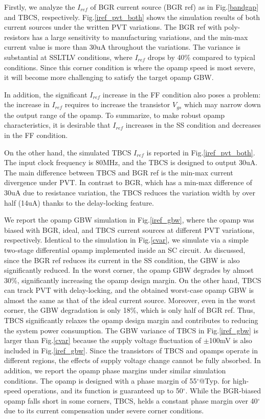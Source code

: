 \documentclass[paper]{ieice}
\begin{document}
Firstly, we analyze the $I_{ref}$ of BGR current source (BGR ref)\cite{banba1999cmos} as in Fig.\ref{bandgap} and TBCS, respectively. Fig.\ref{iref_pvt_both} shows the simulation results of both current sources under the written PVT variations. The BGR ref with poly-resistors has a large sensitivity to manufacturing variations, and the min-max current value is more than 30uA throughout the variations. The variance is substantial at SSLTLV conditions, where $I_{ref}$ drops by 40\% compared to typical conditions.
Since this corner condition is where the opamp speed is most severe, it will become more challenging to satisfy the target opamp GBW. %

In addition, the significant $I_{ref}$ increase in the FF condition also poses a problem: the increase in $I_{ref}$ requires to increase the transistor $V_{gs}$ which may narrow down the output range of the opamp. To summarize, to make robust opamp characteristics, it is desirable that $I_{ref}$ increases in the SS condition and decreases in the FF condition.

On the other hand, the simulated TBCS $I_{ref}$ is reported in Fig.\ref{iref_pvt_both}. The input clock frequency is 80MHz, and the TBCS is designed to output 30uA. The main difference between TBCS and BGR ref is the min-max current divergence under PVT. In contrast to BGR, which has a min-max difference of 30uA due to resistance variation, the TBCS reduces the variation width by over half (14uA) thanks to the delay-locking feature.

We report the opamp GBW simulation in Fig.\ref{iref_gbw}, where the opamp was biased with BGR, ideal, and TBCS current sources at different PVT variations, respectively. Identical to the simulation in Fig.\ref{cvar}, we simulate via a simple two-stage differential opamp implemented inside an SC circuit.
As discussed, since the BGR ref reduces its current in the SS condition, the GBW is also significantly reduced. In the worst corner, the opamp GBW degrades by almost 30\%, significantly increasing the opamp design margin.
On the other hand, TBCS can track PVT with delay-locking, and the obtained worst-case opamp GBW is almost the same as that of the ideal current source. Moreover, even in the worst corner, the GBW degradation is only 18\%, which is only half of BGR ref. Thus, TBCS significantly relaxes the opamp design margin and contributes to reducing the system power consumption.
The GBW variance of TBCS in Fig.\ref{iref_gbw} is larger than Fig.\ref{cvar} because the supply voltage fluctuation of $\pm$100mV is also included in Fig.\ref{iref_gbw}. Since the transistors of TBCS and opamps operate in different regions, the effects of supply voltage change cannot be fully absorbed.
In addition, we report the opamp phase margins under similar simulation conditions. The opamp is designed with a phase margin of 55$^\circ$@Typ. for high-speed operations, and its function is guaranteed up to 50$^\circ$. While the BGR-biased opamp falls short in some corners, TBCS, helds a constant phase margin over 40$^\circ$ due to its current compensation under severe corner conditions.
\end{document}
